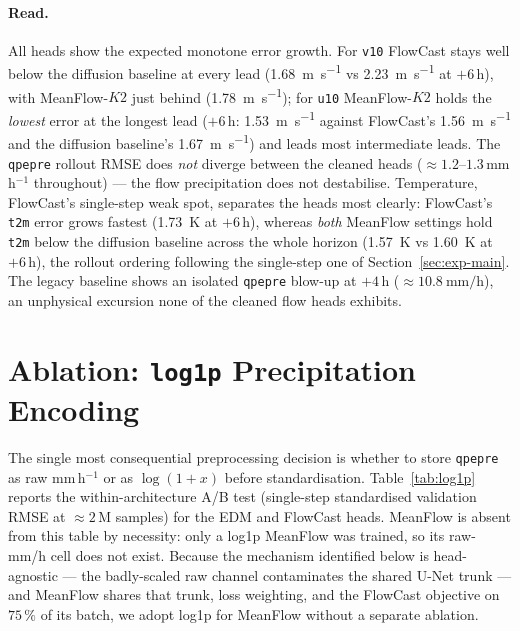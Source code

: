 \paragraph{Read.} All heads show the expected monotone error growth. For \texttt{v10} FlowCast stays well below the diffusion baseline at every lead (\SI{1.68}{\metre\per\second} vs \SI{2.23}{\metre\per\second} at $+6$\,h), with MeanFlow-$K2$ just behind (\SI{1.78}{\metre\per\second}); for \texttt{u10} MeanFlow-$K2$ holds the \emph{lowest} error at the longest lead ($+6$\,h: \SI{1.53}{\metre\per\second} against FlowCast's \SI{1.56}{\metre\per\second} and the diffusion baseline's \SI{1.67}{\metre\per\second}) and leads most intermediate leads. The \texttt{qpepre} rollout RMSE does \emph{not} diverge between the cleaned heads ($\approx 1.2$--$1.3$\,mm\,h$^{-1}$ throughout) --- the flow precipitation does not destabilise. Temperature, FlowCast's single-step weak spot, separates the heads most clearly: FlowCast's \texttt{t2m} error grows fastest (\SI{1.73}{\kelvin} at $+6$\,h), whereas \emph{both} MeanFlow settings hold \texttt{t2m} below the diffusion baseline across the whole horizon (\SI{1.57}{\kelvin} vs \SI{1.60}{\kelvin} at $+6$\,h), the rollout ordering following the single-step one of Section~\ref{sec:exp-main}. The legacy baseline shows an isolated \texttt{qpepre} blow-up at $+4$\,h ($\approx \SI{10.8}{\milli\metre\per\hour}$), an unphysical excursion none of the cleaned flow heads exhibits.

\section{Ablation: \texttt{log1p} Precipitation Encoding}
\label{sec:exp-log1p}

The single most consequential preprocessing decision is whether to store \texttt{qpepre} as raw mm\,h$^{-1}$ or as $\log(1+x)$ before standardisation. Table~\ref{tab:log1p} reports the within-architecture A/B test (single-step standardised validation RMSE at $\approx 2\,\text{M}$ samples) for the EDM and FlowCast heads. MeanFlow is absent from this table by necessity: only a log1p MeanFlow was trained, so its raw-mm/h cell does not exist. Because the mechanism identified below is head-agnostic --- the badly-scaled raw channel contaminates the shared U-Net trunk --- and MeanFlow shares that trunk, loss weighting, and the FlowCast objective on $75\,\%$ of its batch, we adopt log1p for MeanFlow without a separate ablation.

